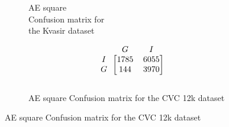 \begin{figure}[h]
\begin{subfigure}[b]{0.49\textwidth}
        
\caption{AE square \\Confusion matrix for \\the Kvasir dataset}
\label{mat:kvasir_CM_IRV2_AE_SQUARE}
\end{subfigure}
\begin{subfigure}[b]{0.25\textwidth}
        \[
\begin{blockarray}{ccc}
& G & I  \\
\begin{block}{c[cc]}
 		I&1785 & 6055\\
        G&144  & 3970\\
\end{block}
\end{blockarray}
\]   
\caption{AE square Confusion matrix for the CVC 12k dataset}
\label{mat:cvc12k_CM_IRV2_AE_SQUARE}
\end{subfigure}

\vspace{1cm}


\end{figure}
